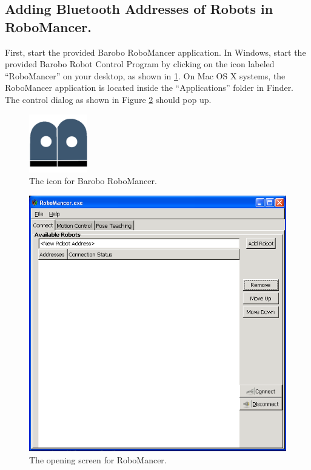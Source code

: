 \documentclass{article}
\begin{document}
\subsection{\label{sec:pairing_robotcontroller} Adding Bluetooth Addresses of Robots in RoboMancer.}
First, start the provided Barobo RoboMancer application.
In Windows, start the provided Barobo Robot Control Program by clicking on the icon labeled 
``RoboMancer'' on your desktop, as shown in \ref{fig:barobo_icon.png}. On Mac OS X systems,
the RoboMancer application is located inside the ``Applications'' folder in Finder. The 
control dialog as shown in Figure \ref{fig:shot1.png} should pop up.
\begin{figure}[H]
\begin{center}
\includegraphics[width=1in]{images/barobo_icon.png}
\end{center}
\caption{\label{fig:barobo_icon.png} The icon for Barobo RoboMancer.}
\end{figure}

\begin{figure}[H]
\begin{center}
\includegraphics[width=4.5in]{images/robomancer_screenshot1.png}
\end{center}
\caption{\label{fig:shot1.png} The opening screen for RoboMancer.}
\end{figure}
\end{document}
